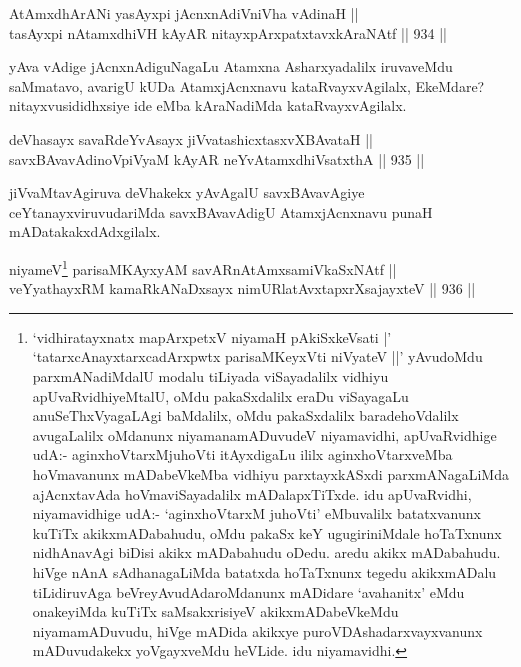 
\begin{shl}
AtAmxdhArANi yasAyxpi jAcnxnAdiVniVha vAdinaH || \\
tasAyxpi nA\s \s tamxdhiVH kAyAR nitayxpArxpatxtavxkAraNAtf \hfill || 934 ||  
\end{shl}

\begin{artha}
yAva vAdige jAcnxnAdiguNagaLu Atamxna Asharxyadalilx iruvaveMdu saMmatavo, avarigU kUDa AtamxjAcnxnavu kataRvayxvAgilalx, EkeMdare? nitayxvusididhxsiye ide eMba kAraNadiMda kataRvayxvAgilalx.
\end{artha}


\begin{shl}
deVhasayx savaRdeYvAsayx jiVvatashicxtasxvXBAvataH ||  \\
savxBAvavAdinoV\s piVyaM kAyAR neYvA\s \s tamxdhiVsatxthA \hfill || 935 ||  
\end{shl}

\begin{artha}
jiVvaMtavAgiruva deVhakekx yAvAgalU savxBAvavAgiye ceYtanayxviruvudariMda savxBAvavAdigU AtamxjAcnxnavu punaH mADatakakxdAdxgilalx.
\end{artha}



\begin{shl}
niyameV\footnote{`vidhiratayxnatx mapArxpetxV niyamaH pAkiSxkeVsati |' `tatarxcAnayxtarxcadArxpwtx parisaMKeyxVti niVyateV ||' yAvudoMdu parxmANadiMdalU modalu tiLiyada viSayadalilx vidhiyu apUvaRvidhiyeMtalU, oMdu pakaSxdalilx eraDu viSayagaLu anuSeThxVyagaLAgi baMdalilx, oMdu pakaSxdalilx baradehoVdalilx avugaLalilx oMdanunx niyamanamADuvudeV niyamavidhi, apUvaRvidhige udA:- aginxhoVtarxMjuhoVti itAyxdigaLu ililx aginxhoVtarxveMba hoVmavanunx mADabeVkeMba vidhiyu parxtayxkASxdi parxmANagaLiMda ajAcnxtavAda hoVmaviSayadalilx mADalapxTiTxde. idu apUvaRvidhi, niyamavidhige udA:- `aginxhoVtarxM juhoVti' eMbuvalilx batatxvanunx kuTiTx akikxmADabahudu, oMdu pakaSx keY ugugiriniMdale hoTaTxnunx nidhAnavAgi biDisi akikx mADabahudu oDedu. aredu akikx mADabahudu. hiVge nAnA sAdhanagaLiMda batatxda hoTaTxnunx tegedu akikxmADalu tiLidiruvAga beVreyAvudAdaroMdanunx mADidare `avahanitx' eMdu onakeyiMda kuTiTx saMsakxrisiyeV akikxmADabeVkeMdu niyamamADuvudu, hiVge mADida akikxye puroVDAshadarxvayxvanunx mADuvudakekx yoVgayxveMdu heVLide. idu niyamavidhi.} parisaMKAyxyAM savARnAtAmxsamiVkaSxNAtf || \\
veYyathayxRM kamaRkANaDxsayx nimURlatAvxtapxrXsajayxteV \hfill || 936 ||  
\end{shl}

